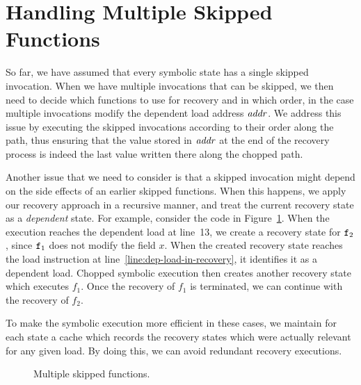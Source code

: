 
\section{Handling Multiple Skipped Functions}
\label{Se:SkipMultipleFuncs}
So far, we have assumed that every symbolic state has a single skipped
invocation. When we have multiple invocations that can be skipped, we
then need to decide which functions to use for recovery and in which
order, in the case multiple invocations modify the dependent load
address $\mathit{addr}$. We address this issue by executing the skipped
invocations according to their order along the path, thus ensuring
that the value stored in $\mathit{addr}$ at the end of the recovery process is
indeed the last value written there along the chopped path.

Another issue that we need to consider is that
a skipped invocation might depend on the side
effects of an earlier skipped functions. When this happens, we apply
our recovery approach in a recursive manner, and treat the current
recovery state as a \emph{dependent} state. For example, consider the
code in Figure~\ref{fig:multiple-skipped-functions}. When the
execution reaches the dependent load at line~13, we create a recovery
state for $\texttt{f}_2$, since $\texttt{f}_1$ does not modify the field
$x$.  When the created recovery state reaches the load instruction at
line~\ref{line:dep-load-in-recovery}, it identifies it as a dependent load. Chopped symbolic
execution then creates another recovery state which executes $f_1$.
Once the recovery of $f_1$ is terminated, we can continue with the
recovery of $f_2$.

To make the symbolic execution more efficient in these cases, we
maintain for each state a cache which records the recovery states
which were actually relevant for any given load. By doing this, we can
avoid redundant recovery executions.

\begin{figure}[tbp]

\caption{Multiple skipped functions.}\vspace{-5mm}
\label{fig:multiple-skipped-functions}
\end{figure}

